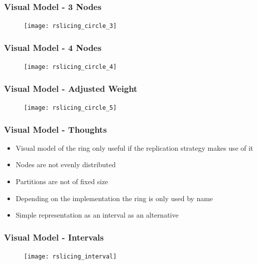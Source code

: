 \documentclass[aspectratio=169]{beamer}
\begin{document}
\begin{frame}
\frametitle{Visual Model - 3 Nodes}
\begin{figure}
\texttt{[image: rslicing\_circle\_3]}
\end{figure}
\end{frame}

\begin{frame}
\frametitle{Visual Model - 4 Nodes}
\begin{figure}
\texttt{[image: rslicing\_circle\_4]}
\end{figure}
\end{frame}

\begin{frame}
\frametitle{Visual Model - Adjusted Weight}
\begin{figure}
\texttt{[image: rslicing\_circle\_5]}
\end{figure}
\end{frame}

\begin{frame}
\frametitle{Visual Model - Thoughts}
\begin{itemize}
\item Visual model of the ring only useful if the replication strategy makes use of it
\item Nodes are not evenly distributed
\item Partitions are not of fixed size
\item Depending on the implementation the ring is only used by name
\item Simple representation as an interval as an alternative
\end{itemize}
\end{frame}

\begin{frame}
\frametitle{Visual Model - Intervals}
\begin{figure}
\texttt{[image: rslicing\_interval]}
\end{figure}
\end{frame}
\end{document}
